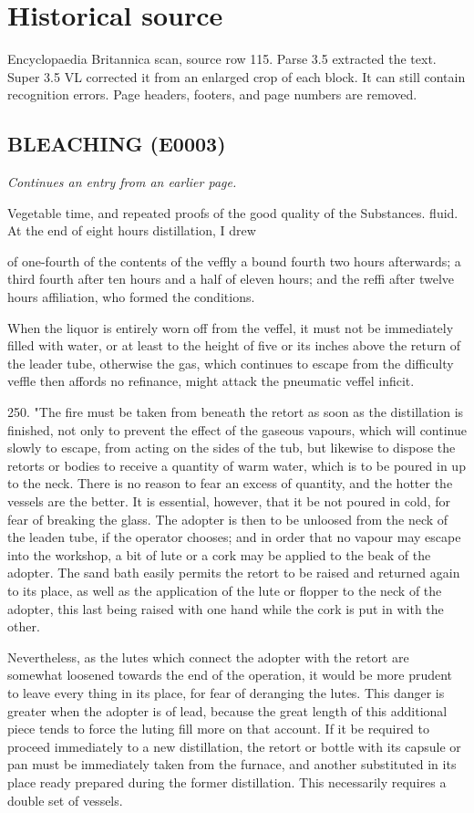 \documentclass{article}
\begin{document}
\section*{Historical source}
Encyclopaedia Britannica scan, source row 115. Parse 3.5 extracted the text. Super 3.5 VL corrected it from an enlarged crop of each block. It can still contain recognition errors.
Page headers, footers, and page numbers are removed.

\subsection*{BLEACHING (E0003)}
\textit{Continues an entry from an earlier page.}

Vegetable time, and repeated proofs of the good quality of the
Substances. fluid. At the end of eight hours distillation, I drew

of one-fourth of the contents of the veffly a bound
fourth two hours afterwards; a third fourth after ten
hours and a half of eleven hours; and the reffi after
twelve hours affiliation, who formed the conditions.

When the liquor is entirely worn off from the
veffel, it must not be immediately filled with water, or at least to the height of five or its inches above the
return of the leader tube, otherwise the gas, which
continues to escape from the difficulty veffle then
affords no refinance, might attack the pneumatic veffel
inficit.

250. "The fire must be taken from beneath the retort as soon as the distillation is finished, not only to prevent the effect of the gaseous vapours, which will continue slowly to escape, from acting on the sides of the tub, but likewise to dispose the retorts or bodies to receive a quantity of warm water, which is to be poured in up to the neck. There is no reason to fear an excess of quantity, and the hotter the vessels are the better. It is essential, however, that it be not poured in cold, for fear of breaking the glass. The adopter is then to be unloosed from the neck of the leaden tube, if the operator chooses; and in order that no vapour may escape into the workshop, a bit of lute or a cork may be applied to the beak of the adopter. The sand bath easily permits the retort to be raised and returned again to its place, as well as the application of the lute or flopper to the neck of the adopter, this last being raised with one hand while the cork is put in with the other.

Nevertheless, as the lutes which connect the adopter with the retort are somewhat loosened towards the end of the operation, it would be more prudent to leave every thing in its place, for fear of deranging the lutes. This danger is greater when the adopter is of lead, because the great length of this additional piece tends to force the luting fill more on that account. If it be required to proceed immediately to a new distillation, the retort or bottle with its capsule or pan must be immediately taken from the furnace, and another substituted in its place ready prepared during the former distillation. This necessarily requires a double set of vessels.
\end{document}

